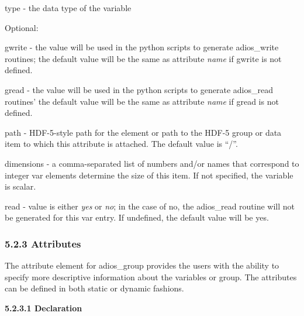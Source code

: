 \vspace{10pt}
type - the data type of the variable

\vspace{10pt}
\leftskip=0pt
\parindent=0pt
Optional: 

\vspace{10pt}
\leftskip=72pt
\parindent=-50pt
gwrite - the value will be used in the python scripts to generate adios\_write 
routines; the default value will be the same as attribute \textit{name} if gwrite 
is not defined.

\vspace{10pt}
\leftskip=67pt
\parindent=-45pt
gread - the value will be used in the python scripts to generate adios\_read routines' 
the default value will be the same as attribute \textit{name} if  gread is not 
defined.

\vspace{10pt}
\leftskip=58pt
\parindent=-36pt
path - HDF-5-style path for the element or path to the HDF-5 group or data item 
to which this attribute is attached.  The default value is ``/''.

\vspace{10pt}
\leftskip=94pt
\parindent=-72pt
dimensions - a comma-separated list of numbers and/or names that correspond to 
integer var elements determine the size of this item. If not specified, the variable 
is scalar.

\vspace{10pt}
\leftskip=58pt
\parindent=-36pt
read - value is either \textit{yes} or \textit{no}; in the case of no, the adios\_read 
routine will not be generated for this var entry. If undefined, the default value 
will be yes. \label{HToc82064271}\label{HToc82067521}\label{HToc84890245}\label{HToc212016621}\label{HToc212016863}\label{HRef278897265}\label{HToc182553368}

\vspace{10pt}
\subsubsection*{{\large \textbf{5.2.3 Attributes}}}

\vspace{10pt}
\leftskip=0pt
\parindent=0pt
The attribute element for adios\_group provides the users with the ability to specify 
more descriptive information about the variables or group. The attributes can be 
defined in both static or dynamic fashions. \label{HToc82064272}

\vspace{10pt}
\textbf{5.2.3.1 Declaration}

